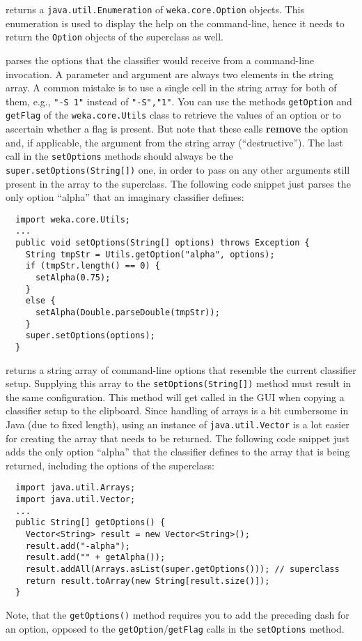 returns a \texttt{java.util.Enumeration} of \texttt{weka.core.Option} objects.
This enumeration is used to display the help on the command-line, hence it needs
to return the \texttt{Option} objects of the superclass as well.

parses the options that the classifier would receive from a command-line
invocation. A parameter and argument are always two elements in the string
array. A common mistake is to use a single cell in the string array for both of
them, e.g., \texttt{"-S 1"} instead of \texttt{"-S","1"}. You can use the
methods \texttt{getOption} and \texttt{getFlag} of the \texttt{weka.core.Utils}
class to retrieve the values of an option or to ascertain whether a flag is
present. But note that these calls \textbf{remove} the option and, if
applicable, the argument from the string array (``destructive''). The last call
in the \texttt{setOptions} methods should always be the
\texttt{super.setOptions(String[])} one, in order to pass on any other arguments
still present in the array to the superclass. The following code snippet just
parses the only option ``alpha'' that an imaginary classifier defines:
{\small \begin{verbatim}
  import weka.core.Utils;
  ...
  public void setOptions(String[] options) throws Exception {
    String tmpStr = Utils.getOption("alpha", options);
    if (tmpStr.length() == 0) {
      setAlpha(0.75);
    }
    else {
      setAlpha(Double.parseDouble(tmpStr));
    }
    super.setOptions(options);
  }
\end{verbatim}}

\clearpage

returns a string array of command-line options that resemble the current
classifier setup. Supplying this array to the \texttt{setOptions(String[])}
method must result in the same configuration. This method will get called in the
GUI when copying a classifier setup to the clipboard. Since handling of arrays
is a bit cumbersome in Java (due to fixed length), using an instance of
\texttt{java.util.Vector} is a lot easier for creating the array that needs to
be returned. The following code snippet just adds the only option ``alpha'' that
the classifier defines to the array that is being returned, including the
options of the superclass:
\begin{verbatim}
  import java.util.Arrays;
  import java.util.Vector;
  ...
  public String[] getOptions() {
    Vector<String> result = new Vector<String>();
    result.add("-alpha");
    result.add("" + getAlpha());
    result.addAll(Arrays.asList(super.getOptions())); // superclass
    return result.toArray(new String[result.size()]);
  }
\end{verbatim}
Note, that the \texttt{getOptions()} method requires you to add the preceding
dash for an option, opposed to the \texttt{getOption}/\texttt{getFlag} calls in
the \texttt{setOptions} method.

